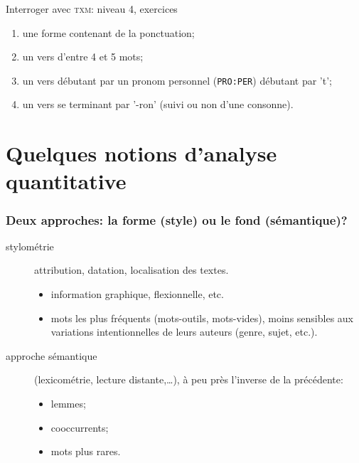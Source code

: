 \documentclass{beamer}
\begin{document}
\begin{frame}{Interroger avec \textsc{txm}: niveau 4, exercices}

\begin{enumerate}
	\item une forme contenant de la ponctuation;
	\item un vers d'entre 4 et 5 mots;
	\item un vers débutant par un pronom personnel (\texttt{PRO:PER}) débutant par 't';
	\item un vers se terminant par '-ron' (suivi ou non d'une consonne).
\end{enumerate}

\end{frame}

\section{Quelques notions d'analyse quantitative}

\begin{frame}[fragile]
\frametitle{Deux approches: la forme (style) ou le fond (sémantique)?}

\begin{description}
	\item[stylométrie] attribution, datation, localisation des textes. 
		\begin{itemize}
			\item information graphique, flexionnelle, etc. 
			\item \alert{mots les plus fréquents} (mots-outils, mots-vides), moins sensibles aux variations intentionnelles de leurs auteurs (genre, sujet, etc.).
		\end{itemize}
	\item[approche sémantique] (lexicométrie, lecture distante,…), à peu près l'inverse de la précédente: 
		\begin{itemize}
			\item lemmes;
			\item cooccurrents;
			\item mots plus rares.
		\end{itemize}
\end{description}

\end{frame}
\end{document}
